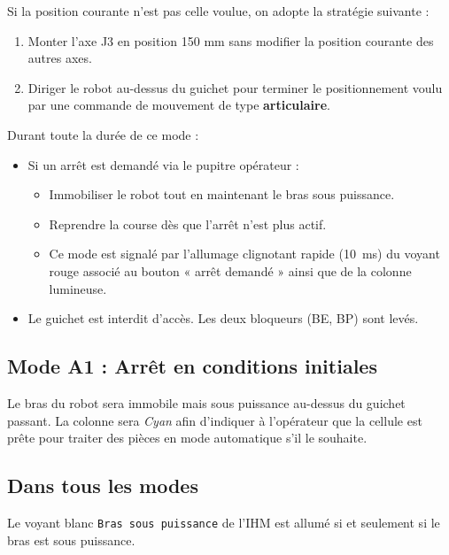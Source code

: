Si la position courante n'est pas celle voulue, on adopte la stratégie suivante :
\begin{enumerate}
    \item Monter l'axe J3 en position 150 mm sans modifier la position courante des autres axes.
    \item Diriger le robot au-dessus du guichet pour terminer le positionnement voulu par une commande de mouvement de type \textbf{articulaire}.
\end{enumerate}
Durant toute la durée de ce mode : 
\begin{itemize}
    \item Si un arrêt est demandé via le pupitre opérateur : 
    \begin{itemize}
        \item Immobiliser le robot tout en maintenant le bras sous puissance.
        \item Reprendre la course dès que l'arrêt n'est plus actif.
        \item Ce mode est signalé par l'allumage clignotant rapide (\SI{10}{ms}) du voyant rouge associé au bouton « arrêt demandé » ainsi que de la colonne lumineuse.
    \end{itemize}
    \item Le guichet est interdit d'accès. Les deux bloqueurs (BE, BP) sont levés.
\end{itemize}

\subsection{Mode A1 : Arrêt en conditions initiales}
Le bras du robot sera immobile mais sous puissance au-dessus du guichet passant. La colonne sera \textit{Cyan} afin d'indiquer à l'opérateur que la cellule est prête pour traiter des pièces en mode automatique s'il le souhaite.

\subsection{Dans tous les modes}
Le voyant blanc \texttt{Bras sous puissance} de l'IHM est allumé si et seulement si le bras est sous puissance. 
